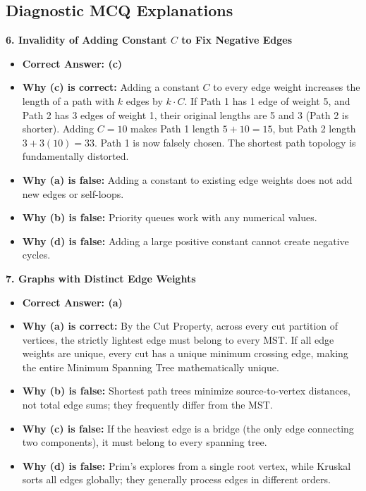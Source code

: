 \subsection*{Diagnostic MCQ Explanations}

\textbf{6. Invalidity of Adding Constant $C$ to Fix Negative Edges}
\begin{itemize}
    \item \textbf{Correct Answer: (c)}
    \item \textbf{Why (c) is correct:} Adding a constant $C$ to every edge weight increases the length of a path with $k$ edges by $k \cdot C$. If Path 1 has 1 edge of weight 5, and Path 2 has 3 edges of weight 1, their original lengths are 5 and 3 (Path 2 is shorter). Adding $C = 10$ makes Path 1 length $5 + 10 = 15$, but Path 2 length $3 + 3(10) = 33$. Path 1 is now falsely chosen. The shortest path topology is fundamentally distorted.
    \item \textbf{Why (a) is false:} Adding a constant to existing edge weights does not add new edges or self-loops.
    \item \textbf{Why (b) is false:} Priority queues work with any numerical values.
    \item \textbf{Why (d) is false:} Adding a large positive constant cannot create negative cycles.
\end{itemize}

\textbf{7. Graphs with Distinct Edge Weights}
\begin{itemize}
    \item \textbf{Correct Answer: (a)}
    \item \textbf{Why (a) is correct:} By the Cut Property, across every cut partition of vertices, the strictly lightest edge must belong to every MST. If all edge weights are unique, every cut has a unique minimum crossing edge, making the entire Minimum Spanning Tree mathematically unique.
    \item \textbf{Why (b) is false:} Shortest path trees minimize source-to-vertex distances, not total edge sums; they frequently differ from the MST.
    \item \textbf{Why (c) is false:} If the heaviest edge is a bridge (the only edge connecting two components), it must belong to every spanning tree.
    \item \textbf{Why (d) is false:} Prim's explores from a single root vertex, while Kruskal sorts all edges globally; they generally process edges in different orders.
\end{itemize}

